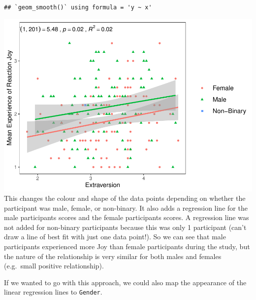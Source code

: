 \documentclass[
]{book}
\begin{document}
\begin{verbatim}
## `geom_smooth()` using formula = 'y ~ x'
\end{verbatim}

\includegraphics{rintro_demo_files/figure-latex/unnamed-chunk-315-1.pdf}
This changes the colour and shape of the data points depending on whether the participant was male, female, or non-binary. It also adds a regression line for the male participants scores and the female participants scores. A regression line was not added for non-binary participants because this was only 1 participant (can't draw a line of best fit with just one data point!). So we can see that male participants experienced more Joy than female participants during the study, but the nature of the relationship is very similar for both males and females (e.g.~small positive relationship).

If we wanted to go with this approach, we could also map the appearance of the linear regression lines to \texttt{Gender}.
\end{document}
